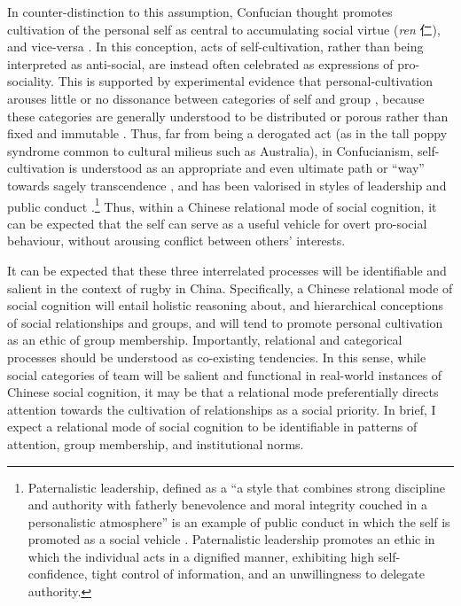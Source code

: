 \begin{CJK}{UTF8}{gbsn}
In counter-distinction to this assumption, Confucian thought promotes cultivation of the personal self as central to accumulating social virtue (\textit{ren} 仁), and vice-versa \citep{Hwang2012}.
In this conception, acts of self-cultivation, rather than being interpreted as anti-social, are instead often celebrated as expressions of pro-sociality.  This is supported by experimental evidence that personal-cultivation arouses little or no dissonance between categories of self and group \citep{Suh2002}, because these categories are generally understood to be distributed or porous rather than fixed and immutable \citep{Nisbett2003}.  Thus, far from being a derogated act (as in the tall poppy syndrome common to cultural milieus such as Australia), in Confucianism, self-cultivation is understood as an appropriate and even ultimate path or ``way'' towards sagely transcendence \citep[106]{Hwang2012}, and has been valorised in styles of leadership and public conduct \citep{Farh2000,Cheng2004}.\footnote{Paternalistic leadership, defined as a ``a style that combines strong discipline and authority with fatherly benevolence and moral integrity couched in a personalistic atmosphere'' is an example of public conduct in which the self is promoted as a social vehicle \citep[91]{Cheng2004}.  Paternalistic leadership promotes an ethic in which the individual acts in a dignified manner, exhibiting high self-confidence, tight control of information, and an unwillingness to delegate authority.}
Thus, within a Chinese relational mode of social cognition, it can be expected that the self can serve as a useful vehicle for overt pro-social behaviour, without arousing conflict between others' interests.

It can be expected that these three interrelated processes will be identifiable and salient in the context of rugby in China.  Specifically, a Chinese relational mode of social cognition will entail holistic reasoning about, and hierarchical conceptions of social relationships and groups, and will tend to promote personal cultivation as an ethic of group membership.    Importantly, relational and categorical processes should be understood as co-existing tendencies.  In this sense, while social categories of team will be salient and functional in real-world instances of Chinese social cognition, it may be that a relational mode preferentially directs attention towards the cultivation of relationships as a social priority.  In brief, I expect a relational mode of social cognition to be identifiable in patterns of attention, group membership, and institutional norms.


\end{CJK}
